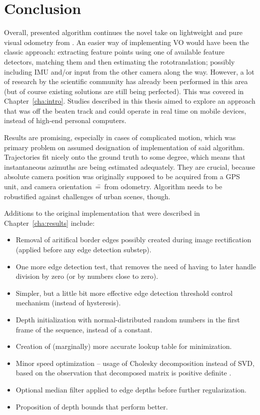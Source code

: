 \chapter{Conclusion}

Overall, presented algorithm continues the novel take on lightweight and pure visual odometry from \cite{jose2015realtime}. An easier way of implementing VO would have been the classic approach: extracting feature points using one of available feature detectors, matching them and then estimating the rototranslation; possibly including IMU and/or input from the other camera along the way. However, a lot of research by the scientific community has already been performed in this area (but of course existing solutions are still being perfected). This was covered in Chapter~\ref{cha:intro}. Studies described in this thesis aimed to explore an approach that was off the beaten track and could operate in real time on mobile devices, instead of high-end personal computers.

Results are promising, especially in cases of complicated motion, which was primary problem on assumed designation of implementation of said algorithm. Trajectories fit nicely onto the ground truth to some degree, which means that instantaneous azimuths are being estimated adequately. They are crucial, because absolute camera position was originally supposed to be acquired from a GPS unit, and camera orientation~\==~from odometry. Algorithm needs to be robustified against challenges of urban scenes, though.

Additions to the original implementation \cite{jose2015realtime} that were described in Chapter~\ref{cha:results} include:
\begin{itemize}
	\item Removal of aritifical border edges possibly created during image rectification (applied before any edge detection substep).
	\item One more edge detection test, that removes the need of having to later handle division by zero (or by numbers close to zero).
	\item Simpler, but a little bit more effective edge detection threshold control mechanism (instead of hysteresis).
	\item Depth initialization with normal-distributed random numbers in the first frame of the sequence, instead of a constant.
	\item Creation of (marginally) more accurate lookup table for minimization.
	\item Minor speed optimization -- usage of Cholesky decomposition instead of SVD, based on the observation that decomposed matrix is positive definite \cite{madsen2004methods}.
	\item Optional median filter applied to edge depths before further regularization.
	\item Proposition of depth bounds that perform better.
\end{itemize}


